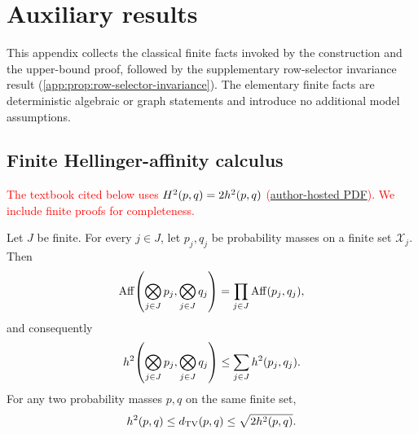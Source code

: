 \section{Auxiliary results}
\label{app:auxiliary}

This appendix collects the classical finite facts invoked by the construction
and the upper-bound proof, followed by the supplementary row-selector
invariance result (\cref{app:prop:row-selector-invariance}).
The elementary finite facts are deterministic algebraic or graph
statements and introduce no additional model assumptions.

\subsection{Finite Hellinger-affinity calculus}
\label{app:auxiliary-affinity}

\textcolor{red}{The textbook cited below uses $H^2(p,q)=2h^2(p,q)$
(\href{https://people.lids.mit.edu/yp/homepage/data/itbook-export.pdf}{author-hosted PDF}).
We include finite proofs for completeness.}

\begin{lemma}
\label{app:lem:finite-hellinger-calculus}
Let $J$ be finite.  For every $j\in J$, let $p_j,q_j$ be probability masses
on a finite set $\mathcal X_j$.  Then
\begin{equation}
 \operatorname{Aff}\!\left(\bigotimes_{j\in J}p_j,
                           \bigotimes_{j\in J}q_j\right)
 =\prod_{j\in J}\operatorname{Aff}(p_j,q_j),
 \label{app:eq:aux-product-affinity}
\end{equation}
and consequently
\begin{equation}
 h^2\!\left(\bigotimes_{j\in J}p_j,
                      \bigotimes_{j\in J}q_j\right)
 \le\sum_{j\in J}h^2(p_j,q_j).
 \label{app:eq:aux-product-hellinger}
\end{equation}
For any two probability masses $p,q$ on the same finite set,
\begin{equation}
 h^2(p,q)
 \le d_{\mathrm{TV}}(p,q)
 \le\sqrt{2h^2(p,q)}.
 \label{app:eq:aux-tv-hellinger}
\end{equation}
\end{lemma}

